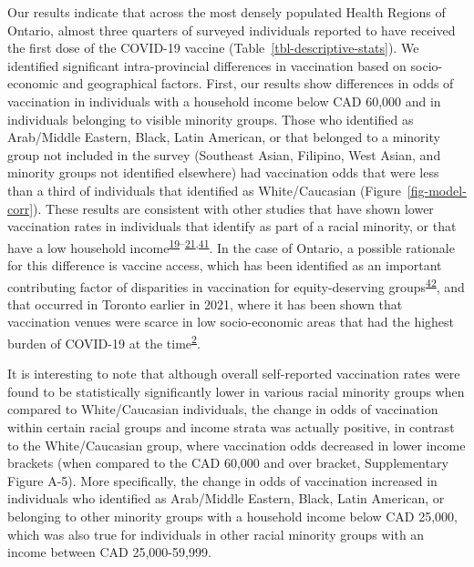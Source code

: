 \documentclass[
  letterpaper,
  DIV=11,
  numbers=noendperiod]{scrartcl}
\begin{document}
Our results indicate that across the most densely populated Health
Regions of Ontario, almost three quarters of surveyed individuals
reported to have received the first dose of the COVID-19 vaccine
(Table~\ref{tbl-descriptive-stats}). We identified significant
intra-provincial differences in vaccination based on socio-economic and
geographical factors. First, our results show differences in odds of
vaccination in individuals with a household income below CAD 60,000 and
in individuals belonging to visible minority groups. Those who
identified as Arab/Middle Eastern, Black, Latin American, or that
belonged to a minority group not included in the survey (Southeast
Asian, Filipino, West Asian, and minority groups not identified
elsewhere) had vaccination odds that were less than a third of
individuals that identified as White/Caucasian
(Figure~\ref{fig-model-corr}). These results are consistent with other
studies that have shown lower vaccination rates in individuals that
identify as part of a racial minority, or that have a low household
income\textsuperscript{\protect\hyperlink{ref-guay2022}{19}--\protect\hyperlink{ref-hussain2022}{21},\protect\hyperlink{ref-carter2022}{41}}.
In the case of Ontario, a possible rationale for this difference is
vaccine access, which has been identified as an important contributing
factor of disparities in vaccination for equity-deserving
groups\textsuperscript{\protect\hyperlink{ref-njoku2021}{42}}, and that
occurred in Toronto earlier in 2021, where it has been shown that
vaccination venues were scarce in low socio-economic areas that had the
highest burden of COVID-19 at the
time\textsuperscript{\protect\hyperlink{ref-bogoch2022}{2}}.

It is interesting to note that although overall self-reported
vaccination rates were found to be statistically significantly lower in
various racial minority groups when compared to White/Caucasian
individuals, the change in odds of vaccination within certain racial
groups and income strata was actually positive, in contrast to the
White/Caucasian group, where vaccination odds decreased in lower income
brackets (when compared to the CAD 60,000 and over bracket,
Supplementary Figure A-5). More specifically, the change in odds of
vaccination increased in individuals who identified as Arab/Middle
Eastern, Black, Latin American, or belonging to other minority groups
with a household income below CAD 25,000, which was also true for
individuals in other racial minority groups with an income between CAD
25,000-59,999.
\end{document}
